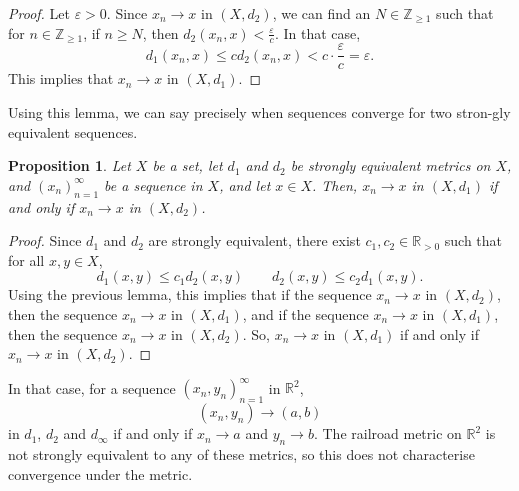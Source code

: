 \documentclass[a4paper, openany]{memoir}
\theoremstyle{definition}
\theoremstyle{plain}
\newtheorem{proposition}[definition]{Proposition}
\begin{document}
\begin{proof}
Let $\varepsilon > 0$. Since $x_n \to x$ in $(X, d_2)$, we can find an $N \in \mathbb{Z}_{\geqslant 1}$ such that for $n \in \mathbb{Z}_{\geqslant 1}$, if $n \geqslant N$, then $d_2(x_n, x) < \frac{\varepsilon}{c}$. In that case, 
\[d_1(x_n, x) \leqslant cd_2(x_n, x) < c \cdot \frac{\varepsilon}{c} = \varepsilon.\]
This implies that $x_n \to x$ in $(X, d_1)$.
\end{proof}
\noindent Using this lemma, we can say precisely when sequences converge for two stron-gly equivalent sequences.
\begin{proposition}
Let $X$ be a set, let $d_1$ and $d_2$ be strongly equivalent metrics on $X$, and $(x_n)_{n=1}^{\infty}$ be a sequence in $X$, and let $x \in X$. Then, $x_n \to x$ in $(X, d_1)$ if and only if $x_n \to x$ in $(X, d_2)$.
\end{proposition}
\begin{proof}
Since $d_1$ and $d_2$ are strongly equivalent, there exist $c_1, c_2 \in \mathbb{R}_{> 0}$ such that for all $x, y \in X$,
\[d_1(x, y) \leqslant c_1 d_2(x, y) \qquad d_2(x, y) \leqslant c_2 d_1(x, y).\]
Using the previous lemma, this implies that if the sequence $x_n \to x$ in $(X, d_2)$, then the sequence $x_n \to x$ in $(X, d_1)$, and if the sequence $x_n \to x$ in $(X, d_1)$, then the sequence $x_n \to x$ in $(X, d_2)$. So, $x_n \to x$ in $(X, d_1)$ if and only if $x_n \to x$ in $(X, d_2)$.
\end{proof}
\noindent In that case, for a sequence $(x_n, y_n)_{n=1}^{\infty}$ in $\mathbb{R}^2$, 
\[(x_n, y_n) \to (a, b)\]
in $d_1$, $d_2$ and $d_\infty$ if and only if $x_n \to a$ and $y_n \to b$. The railroad metric on $\mathbb{R}^2$ is not strongly equivalent to any of these metrics, so this does not characterise convergence under the metric. 
\end{document}
